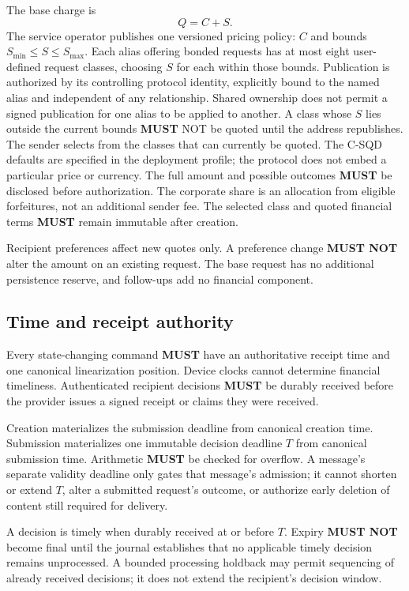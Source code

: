 \documentclass[11pt]{article}
\newcommand{\MUST}{\textbf{MUST}}
\newcommand{\MUSTNOT}{\textbf{MUST NOT}}
\begin{document}
The base charge is
\[
Q=C+S.
\]
The service operator publishes one versioned pricing policy: $C$ and bounds
$S_{\min} \le S \le S_{\max}$. Each alias offering bonded requests has at most eight
user-defined request classes, choosing $S$ for each within those bounds. Publication
is authorized by its controlling protocol identity, explicitly bound to the named
alias and independent of any relationship. Shared ownership does not permit a
signed publication for one alias to be applied to another. A class whose $S$ lies
outside the current bounds \MUST{} NOT be quoted until the address republishes. The
sender selects from the classes that can currently be quoted. The
C-SQD defaults are specified in the deployment profile; the protocol does not
embed a particular price or currency. The full
amount and possible outcomes \MUST{} be disclosed before authorization. The
corporate share is an allocation from eligible forfeitures, not an additional
sender fee. The selected class and quoted financial terms \MUST{} remain
immutable after creation.

Recipient preferences affect new quotes only. A preference change \MUSTNOT{}
alter the amount on an existing request. The base request has no additional
persistence reserve, and follow-ups add no financial component.

\subsection{Time and receipt authority}

Every state-changing command \MUST{} have an authoritative receipt time and one
canonical linearization position. Device clocks cannot determine financial
timeliness. Authenticated recipient decisions \MUST{} be durably received before
the provider issues a signed receipt or claims they were received.

Creation materializes the submission deadline from canonical creation time.
Submission materializes one immutable decision deadline $T$ from canonical
submission time. Arithmetic \MUST{} be checked for overflow. A message's separate
validity deadline only gates that message's admission; it cannot shorten or
extend $T$, alter a submitted request's outcome, or authorize early deletion of
content still required for delivery.

A decision is timely when durably received at or before $T$. Expiry \MUSTNOT{}
become final until the journal establishes that no applicable timely decision
remains unprocessed. A bounded processing holdback may permit sequencing of
already received decisions; it does not extend the recipient's decision window.
\end{document}
